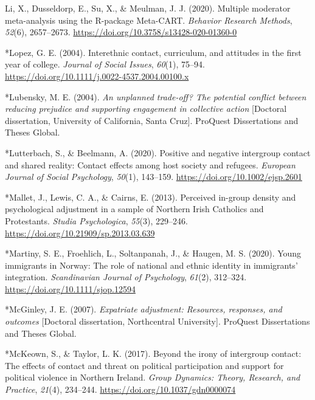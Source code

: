 \documentclass[12pt, letterpaper]{article}
\begin{document}
\leavevmode\hypertarget{ref-li_multiple_2020}{}%
Li, X., Dusseldorp, E., Su, X., \& Meulman, J. J. (2020). Multiple
moderator meta-analysis using the R-package Meta-CART. \emph{Behavior
Research Methods}, \emph{52}(6), 2657--2673.
\url{https://doi.org/10.3758/s13428-020-01360-0}

\leavevmode\hypertarget{ref-1042}{}%
*Lopez, G. E. (2004). Interethnic contact, curriculum, and attitudes in
the first year of college. \emph{Journal of Social Issues},
\emph{60}(1), 75--94.
\url{https://doi.org/10.1111/j.0022-4537.2004.00100.x}

\leavevmode\hypertarget{ref-894}{}%
*Lubensky, M. E. (2004). \emph{An unplanned trade-off? The potential
conflict between reducing prejudice and supporting engagement in
collective action} {[}Doctoral dissertation, University of California,
Santa Cruz{]}. ProQuest Dissertations and Theses Global.

\leavevmode\hypertarget{ref-4000}{}%
*Lutterbach, S., \& Beelmann, A. (2020). Positive and negative
intergroup contact and shared reality: Contact effects among host
society and refugees. \emph{European Journal of Social Psychology},
\emph{50}(1), 143--159. \url{https://doi.org/10.1002/ejsp.2601}

\leavevmode\hypertarget{ref-893}{}%
*Mallet, J., Lewis, C. A., \& Cairns, E. (2013). Perceived in-group
density and psychological adjustment in a sample of Northern Irish
Catholics and Protestants. \emph{Studia Psychologica}, \emph{55}(3),
229--246. \url{https://doi.org/10.21909/sp.2013.03.639}

\leavevmode\hypertarget{ref-3005}{}%
*Martiny, S. E., Froehlich, L., Soltanpanah, J., \& Haugen, M. S.
(2020). Young immigrants in Norway: The role of national and ethnic
identity in immigrants' integration. \emph{Scandinavian Journal of
Psychology}, \emph{61}(2), 312--324.
\url{https://doi.org/10.1111/sjop.12594}

\leavevmode\hypertarget{ref-1850}{}%
*McGinley, J. E. (2007). \emph{Expatriate adjustment: Resources,
responses, and outcomes} {[}Doctoral dissertation, Northcentral
University{]}. ProQuest Dissertations and Theses Global.

\leavevmode\hypertarget{ref-1376}{}%
*McKeown, S., \& Taylor, L. K. (2017). Beyond the irony of intergroup
contact: The effects of contact and threat on political participation
and support for political violence in Northern Ireland. \emph{Group
Dynamics: Theory, Research, and Practice}, \emph{21}(4), 234--244.
\url{https://doi.org/10.1037/gdn0000074}
\end{document}
